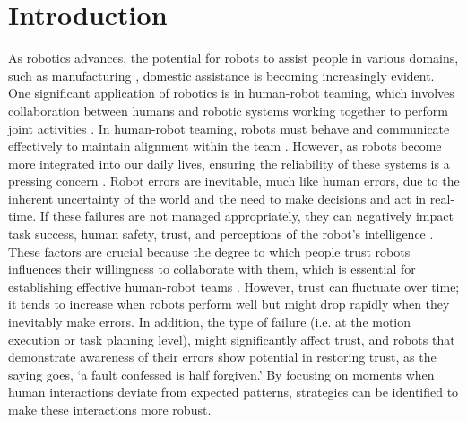 
\section{Introduction}




As robotics advances, the potential for robots to assist people in various domains, such as manufacturing \cite{sauppe_social_2015, terzioglu_designing_2020}, domestic assistance \cite{babel_step_2022, schneiders_domestic_2021, chatterjee_usage_2024} is becoming increasingly evident.  One significant application of robotics is in human-robot teaming, which involves collaboration between humans and robotic systems working together to perform joint activities \cite{mingyue_ma_human-robot_2018}. In human-robot teaming, robots must behave and communicate effectively to maintain alignment within the team \cite{chakraborti_ai_2017}.
 However, as robots become more integrated into our daily lives, ensuring the reliability of these systems is a pressing concern \cite{honig_understanding_2018, desai_effects_2012}. Robot errors are inevitable, much like human errors, due to the inherent uncertainty of the world and the need to make decisions and act in real-time.
If these failures are not managed appropriately, they can negatively impact task success, human safety, trust, and perceptions of the robot’s intelligence \cite{ schaefer_meta-analysis_2016, salem_would_2015, sebo_i_2019, lei_should_2021}. 
These factors are crucial because the degree to which people trust robots influences their willingness to collaborate with them, which is essential for establishing effective human-robot teams \cite{breazeal_social_2016, rossi_matter_2023, huang_anticipatory_2016}. 
However, trust can fluctuate over time; it tends to increase when robots perform well but might drop rapidly when they inevitably make errors. 
In addition, the type of failure (i.e. at the motion execution or task planning level), might significantly affect trust, and robots that demonstrate awareness of their errors show potential in restoring trust, as the saying goes, ‘a fault confessed is half forgiven.’
By focusing on moments when human interactions deviate from expected patterns, strategies can be identified to make these interactions more robust. 


